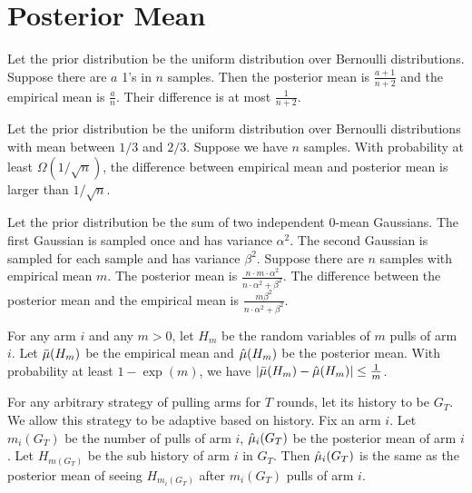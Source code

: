 \section{Posterior Mean}

\begin{example}
Let the prior distribution be the uniform distribution over Bernoulli distributions. Suppose there are $a$ 1's in $n$ samples. Then the posterior mean is $\frac{a+1}{n+2}$ and the empirical mean is $\frac{a}{n}$. Their difference is at most $\frac{1}{n+2}$. 
\end{example}


\begin{example}
Let the prior distribution be the uniform distribution over Bernoulli distributions with mean between $1/3$ and $2/3$. Suppose we have $n$ samples. With probability at least $\Omega(1/\sqrt{n})$, the difference between empirical mean and posterior mean is larger than $1/\sqrt{n}$.
\end{example}

\begin{example}
Let the prior distribution be the sum of two independent 0-mean Gaussians. The first Gaussian is sampled once and has variance $\alpha^2$. The second Gaussian is sampled for each sample and has variance $\beta^2$. Suppose there are $n$ samples with empirical mean $m$. The posterior mean is $\frac{n \cdot m \cdot \alpha^2}{n \cdot \alpha^2 + \beta^2}$. The difference between the posterior mean and the empirical mean is $\frac{m\beta^2}{n\cdot \alpha^2 + \beta^2}$.
\end{example}


\begin{assumption}
\label{ass:post}
For any arm $i$ and any $m >0$, let $H_m$ be the random variables of $m$ pulls of arm $i$. Let $\bar{\mu}(H_m)$ be the empirical mean and $\hat{\mu}(H_m)$ be the posterior mean. With probability at least $1 - \exp(m)$, we have $|\bar{\mu}(H_m) - \hat{\mu}(H_m)| \leq \frac{1}{m}$. 
\end{assumption}

\begin{lemma}
\label{lem:post}
For any arbitrary strategy of pulling arms for $T$ rounds, let its history to be $G_T$. We allow this strategy to be adaptive based on history. Fix an arm $i$. Let $m_i(G_T)$ be the number of pulls of arm $i$, $\hat{\mu}_i(G_T)$ be the posterior mean of arm $i$. Let $H_{m(G_T)}$ be the sub history of arm $i$ in $G_T$. Then $\hat{\mu}_i(G_T)$ is the same as the posterior mean of seeing $H_{m_i(G_T)}$ after $m_i(G_T)$ pulls of arm $i$.
\end{lemma}


